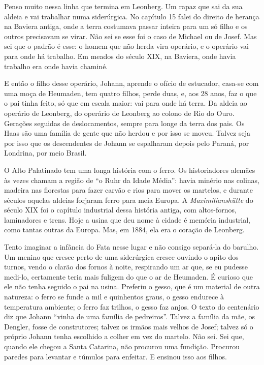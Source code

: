 \documentclass[
  brazilian,
  11pt,
  openany]{book}
\begin{document}
Penso muito nessa linha que termina em Leonberg. Um rapaz que sai da sua
aldeia e vai trabalhar numa siderúrgica. No capítulo 15 falei do direito
de herança na Baviera antiga, onde a terra costumava passar inteira para
um só filho e os outros precisavam se virar. Não sei se esse foi o caso
de Michael ou de Josef. Mas sei que o padrão é esse: o homem que não
herda vira operário, e o operário vai para onde há trabalho. Em meados
do século XIX, na Baviera, onde havia trabalho era onde havia chaminé.

E então o filho desse operário, Johann, aprende o ofício de estucador,
casa-se com uma moça de Heumaden, tem quatro filhos, perde duas, e, aos
28 anos, faz o que o pai tinha feito, só que em escala maior: vai para
onde há terra. Da aldeia ao operário de Leonberg, do operário de
Leonberg ao colono de Rio do Ouro. Gerações seguidas de deslocamentos,
sempre para longe da terra dos pais. Os Haas são uma família de gente
que não herdou e por isso se moveu. Talvez seja por isso que os
descendentes de Johann se espalharam depois pelo Paraná, por Londrina,
por meio Brasil.

O Alto Palatinado tem uma longa história com o ferro. Os historiadores
alemães às vezes chamam a região de ``o Ruhr da Idade Média'': havia
minério nas colinas, madeira nas florestas para fazer carvão e rios para
mover os martelos, e durante séculos aquelas aldeias forjaram ferro para
meia Europa. A \emph{Maximilianshütte} do século XIX foi o capítulo
industrial dessa história antiga, com altos-fornos, laminadores e trens.
Hoje a usina que deu nome à cidade é memória industrial, como tantas
outras da Europa. Mas, em 1884, ela era o coração de Leonberg.

Tento imaginar a infância do Fata nesse lugar e não consigo separá-la do
barulho. Um menino que cresce perto de uma siderúrgica cresce ouvindo o
apito dos turnos, vendo o clarão dos fornos à noite, respirando um ar
que, se eu pudesse medi-lo, certamente teria mais fuligem do que o ar de
Heumaden. É curioso que ele não tenha seguido o pai na usina. Preferiu o
gesso, que é um material de outra natureza: o ferro se funde a mil e
quinhentos graus, o gesso endurece à temperatura ambiente; o ferro faz
trilhos, o gesso faz anjos. O texto do centenário diz que Johann ``vinha
de uma família de pedreiros''. Talvez a família da mãe, os Dengler,
fosse de construtores; talvez os irmãos mais velhos de Josef; talvez só
o próprio Johann tenha escolhido a colher em vez do martelo. Não sei.
Sei que, quando ele chegou a Santa Catarina, não procurou uma fundição.
Procurou paredes para levantar e túmulos para enfeitar. E ensinou isso
aos filhos.
\end{document}
